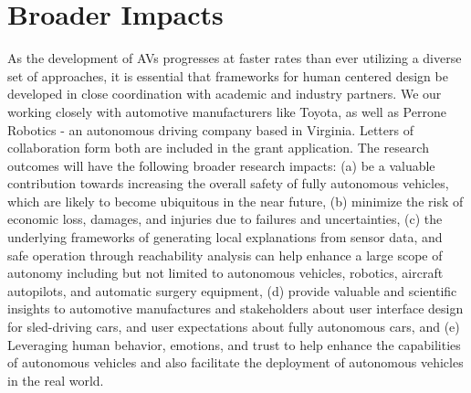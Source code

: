 

\section{Broader Impacts}
\label{sec:broader}

As the development of AVs progresses at faster rates than ever utilizing a diverse set of approaches, it is essential that frameworks for human centered design be developed in close coordination with academic and industry partners. 
We our working closely with automotive manufacturers like Toyota, as well as Perrone Robotics - an autonomous driving company based in Virginia. Letters of collaboration form both are included in the grant application.
The research outcomes will have the following broader research impacts: (a) be a valuable contribution towards increasing the overall safety of fully autonomous vehicles, which are likely to become ubiquitous in the near future, (b) minimize the risk of economic loss, damages, and injuries due to failures and uncertainties, (c) the underlying frameworks of generating local explanations from sensor data, and safe operation through reachability analysis can help enhance a large scope of autonomy including but not limited to autonomous vehicles, robotics, aircraft autopilots, and automatic surgery equipment, (d) provide valuable and scientific insights to automotive manufactures and stakeholders about user interface design for sled-driving cars, and user expectations about fully autonomous cars, and (e) Leveraging human behavior, emotions, and trust to help enhance the capabilities of autonomous vehicles and also facilitate the deployment of autonomous vehicles in the real world.
